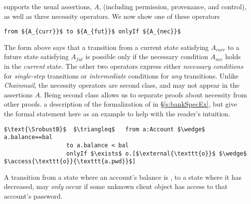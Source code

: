 {%
\Nec supports the usual assertions, $A$, (including permission, provenance,
and control), as well as three  necessity 
{operators. We now show one of these operators} 
\begin{lstlisting}[mathescape=true, language=chainmail, frame=lines]
                                from ${A_{curr}}$ to ${A_{fut}}$ onlyIf ${A_{nec}}$ 
\end{lstlisting}
The  form   {above} says that %
a  {transition} from a current state satisfying $A_{curr}$ to a future
state satisfying $A_{fut}$ %
is possible only if the necessary condition
$A_{nec}$ holds in the \emph{current} state.
 {The other two operators express either \emph{necessary conditions} for
\emph{single-step} transitions %
or \emph{intermediate} conditions for \emph{any} transitions.
}
Unlike  \emph{Chainmail}, 
 the necessity operators %
 are second class, and may not appear in the assertions $A$.
Being second class allows us to separate proofs about necessity from other proofs.
 a description of the formalization of \SrobustB %
in  \S\ref{s:bankSpecEx}, but give the formal statement here as an example to help with 
the reader's intuition. 
\begin{lstlisting}[language = Chainmail, mathescape=true, frame=lines]
$\text{\SrobustB}$  $\triangleq$   from a:Account $\wedge$ a.balance==bal
                  to a.balance < bal
                  onlyIf $\exists$ o.[$\external{\texttt{o}}$ $\wedge$ $\access{\texttt{o}}{\texttt{a.pwd}}$]
\end{lstlisting}
A transition from a  state where an account's balance is , to a  state where 
it has decreased, may \emph{only} occur if  some unknown client object  has access to that account's password. 


}
